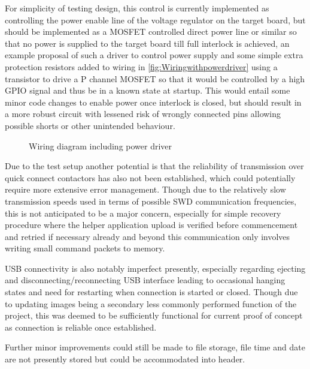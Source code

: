  For simplicity of testing design, this control is currently implemented as controlling the power enable line of the voltage regulator on the target board, but should  be implemented as a MOSFET controlled direct power line or similar so that no power is supplied to the target board till full interlock is achieved, an example proposal of such a driver to control power supply and some simple extra protection resistors added to wiring in \autoref{fig:Wiringwithpowerdriver} using a transistor to drive a P channel MOSFET so that it would be controlled by a high GPIO signal and thus be in a known state at startup. This would entail some minor code changes to enable power once interlock is closed, but should result in a more robust circuit with lessened risk of wrongly connected pins allowing possible shorts or other unintended behaviour.

\begin{figure}[ht]
	\centering
	\caption{Wiring diagram including power driver}
	\label{fig:Wiringwithpowerdriver}
\end{figure}

Due to the test setup another potential is that the reliability of transmission over quick connect contactors has also not been established, which could potentially require more extensive error management. Though due to the relatively slow transmission speeds used in terms of possible SWD communication frequencies, this is not anticipated to be a major concern, especially for simple recovery procedure where the helper application upload is verified before commencement and retried if necessary already and beyond this communication only involves writing small command packets to memory.

USB connectivity is also notably imperfect presently, especially regarding ejecting and disconnecting/reconnecting USB interface leading to occasional hanging states and need for restarting when connection is started or closed. Though due to updating images being a secondary less commonly performed function of the project, this was deemed to be sufficiently functional for current proof of concept as connection is reliable once established.

Further minor improvements could still be made to file storage, file time and date are not presently stored but could be accommodated into header.